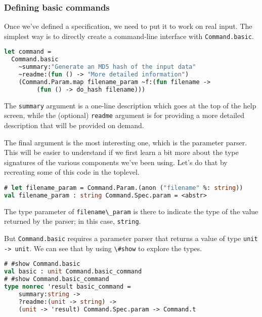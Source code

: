 \hypertarget{defining-basic-commands}{%
\subsubsection{Defining basic commands}\label{defining-basic-commands}}

Once we've defined a specification, we need to put it to work on real
input. The simplest way is to directly create a command-line interface
with \passthrough{\lstinline!Command.basic!}. 

\begin{lstlisting}[language=Caml]
let command =
  Command.basic
    ~summary:"Generate an MD5 hash of the input data"
    ~readme:(fun () -> "More detailed information")
    (Command.Param.map filename_param ~f:(fun filename ->
         (fun () -> do_hash filename)))
\end{lstlisting}

The \passthrough{\lstinline!summary!} argument is a one-line description
which goes at the top of the help screen, while the (optional)
\passthrough{\lstinline!readme!} argument is for providing a more
detailed description that will be provided on demand.

The final argument is the most interesting one, which is the parameter
parser. This will be easier to understand if we first learn a bit more
about the type signatures of the various components we've been using.
Let's do that by recreating some of this code in the toplevel.

\begin{lstlisting}[language=Caml]
# let filename_param = Command.Param.(anon ("filename" %: string))
val filename_param : string Command.Spec.param = <abstr>
\end{lstlisting}

The type parameter of \passthrough{\lstinline!filename\_param!} is there
to indicate the type of the value returned by the parser; in this case,
\passthrough{\lstinline!string!}.

But \passthrough{\lstinline!Command.basic!} requires a parameter parser
that returns a value of type \passthrough{\lstinline!unit -> unit!}. We
can see that by using \passthrough{\lstinline!\#show!} to explore the
types.

\begin{lstlisting}[language=Caml]
# #show Command.basic
val basic : unit Command.basic_command
# #show Command.basic_command
type nonrec 'result basic_command =
    summary:string ->
    ?readme:(unit -> string) ->
    (unit -> 'result) Command.Spec.param -> Command.t
\end{lstlisting}

